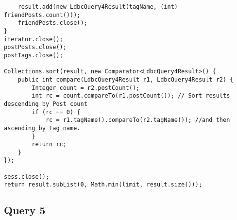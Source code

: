 {\begin{verbatim}
    result.add(new LdbcQuery4Result(tagName, (int) friendPosts.count()));
    friendPosts.close();
}
iterator.close();
postPosts.close();
postTags.close();

Collections.sort(result, new Comparator<LdbcQuery4Result>() {
    public int compare(LdbcQuery4Result r1, LdbcQuery4Result r2) {
        Integer count = r2.postCount();
        int rc = count.compareTo(r1.postCount()); // Sort results descending by Post count
        if (rc == 0) {
            rc = r1.tagName().compareTo(r2.tagName()); //and then ascending by Tag name.
        }
        return rc;
    }
});

sess.close();
return result.subList(0, Math.min(limit, result.size()));

\end{verbatim}
}

\subsection{Query 5}

